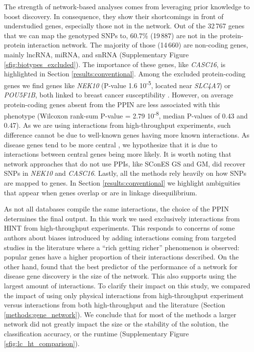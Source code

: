 \documentclass[twocolumn, 10pt]{article}
\begin{document}
The strength of network-based analyses comes from leveraging prior knowledge to boost discovery. In consequence, they show their shortcomings in front of understudied genes, especially those not in the network. Out of the 32\,767 genes that we can map the genotyped SNPs to, 60.7\% (19\,887) are not in the protein-protein interaction network. The majority of those (14\,660) are non-coding genes, mainly lncRNA, miRNA, and snRNA (Supplementary Figure \ref{sfig:biotypes_excluded}). The importance of these genes, like \emph{CASC16}, is highlighted in Section \ref{results:conventional}. Among the excluded protein-coding genes we find genes like \emph{NEK10} (P-value 1.6 \texttimes{} 10\textsuperscript{-5}, located near \emph{SLC4A7}) or \emph{POU5F1B}, both linked to breast cancer susceptibility \cite{ahmed_newly_2009}. However, on average protein-coding genes absent from the PPIN are less associated with this phenotype (Wilcoxon rank-sum P-value = 2.79 \texttimes{} 10\textsuperscript{-8}, median P-values of 0.43 and 0.47). As we are using interactions from high-throughput experiments, such difference cannot be due to well-known genes having more known interactions. As disease genes tend to be more central \cite{pinero_uncovering_2016}, we hypothesize that it is due to interactions between central genes being more likely. It is worth noting that network approaches that do not use PPIs, like SConES GS and GM, did recover SNPs in \emph{NEK10} and \emph{CASC16}. Lastly, all the methods rely heavily on how SNPs are mapped to genes. In Section \ref{results:conventional} we highlight ambiguities that appear when genes overlap or are in linkage disequilibrium.

As not all databases compile the same interactions, the choice of the PPIN determines the final output. In this work we used exclusively interactions from HINT from high-throughput experiments. This responds to concerns of some authors about biases introduced by adding interactions coming from targeted studies in the literature \cite{cai_broker_2010,das_hint:_2012} where a ``rich getting richer'' phenomenon is observed: popular genes have a higher proportion of their interactions described. On the other hand, \citet{huang_systematic_2018} found that the best predictor of the performance of a network for disease gene discovery is the size of the network. This also supports using the largest amount of interactions. To clarify their impact on this study, we compared the impact of using only physical interactions from high-throughput experiment versus interactions from both high-throughput and the literature (Section \ref{methods:gene_network}). We conclude that for most of the methods a larger network did not greatly impact the size or the stability of the solution, the classification accuracy, or the runtime (Supplementary Figure \ref{sfig:lc_ht_comparison}). 
\end{document}

